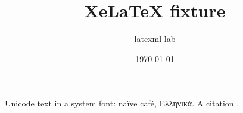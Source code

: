 \documentclass{article}
\title{XeLaTeX fixture}
\author{latexml-lab}
\date{\today}
\begin{document}
\maketitle
Unicode text in a system font: naïve café, Ελληνικά. A citation \citep{lecun2015}.


\end{document}
